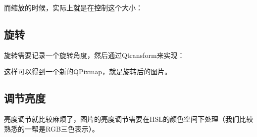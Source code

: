 \documentclass[12pt]{article}
\begin{document}
而缩放的时候，实际上就是在控制这个大小：

\begin{Shaded}
\begin{Highlighting}[]
\OperatorTok{=}\NormalTok{, }\NormalTok{)}

\NormalTok{):}
    \OperatorTok{*=} 
\end{Highlighting}
\end{Shaded}

\subsection{旋转}\label{ux65cbux8f6c}

旋转需要记录一个旋转角度，然后通过Qtransform来实现：

\begin{Shaded}
\begin{Highlighting}[]
\OperatorTok{=}
\OperatorTok{=} 
\end{Highlighting}
\end{Shaded}

这样可以得到一个新的QPixmap，就是旋转后的图片。

\subsection{调节亮度}\label{ux8c03ux8282ux4eaeux5ea6}

亮度调节就比较麻烦了，图片的亮度调节需要在HSL的颜色空间下处理（我们比较熟悉的一帮是RGB三色表示）。
\end{document}
